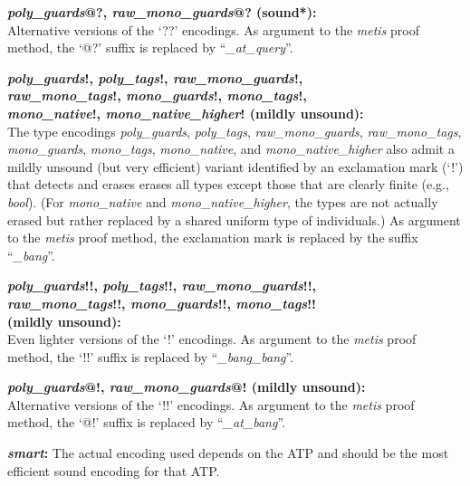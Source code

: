 \documentclass[a4paper,12pt]{article}
\begin{document}
\begin{enum}
\begin{enum}
\item[\labelitemi]
\textbf{%
\textit{poly\_guards}@?, \textit{raw\_mono\_guards}@? (sound*):} \\
Alternative versions of the `\hbox{??}' encodings. As argument to the
\textit{metis} proof method, the `\hbox{@?}' suffix is replaced by
\hbox{``\textit{\_at\_query\/}''}.

\item[\labelitemi]
\textbf{%
\textit{poly\_guards}!, \textit{poly\_tags}!, \textit{raw\_mono\_guards}!, \\
\textit{raw\_mono\_tags}!, \textit{mono\_guards}!, \textit{mono\_tags}!, \\
\textit{mono\_native}!, \textit{mono\_native\_higher}! (mildly unsound):} \\
The type encodings \textit{poly\_guards}, \textit{poly\_tags},
\textit{raw\_mono\_guards}, \textit{raw\_mono\_tags}, \textit{mono\_guards},
\textit{mono\_tags}, \textit{mono\_native}, and \textit{mono\_native\_higher}
also admit a mildly unsound (but very efficient) variant identified by an
exclamation mark (`\hbox{!}') that detects and erases erases all types except
those that are clearly finite (e.g., \textit{bool}). (For \textit{mono\_native}
and \textit{mono\_native\_higher}, the types are not actually erased but rather
replaced by a shared uniform type of individuals.) As argument to the
\textit{metis} proof method, the exclamation mark is replaced by the suffix
\hbox{``\textit{\_bang\/}''}.

\item[\labelitemi]
\textbf{%
\textit{poly\_guards}!!, \textit{poly\_tags}!!, \textit{raw\_mono\_guards}!!, \\
\textit{raw\_mono\_tags}!!, \textit{mono\_guards}!!, \textit{mono\_tags}!! \\
(mildly unsound):} \\
Even lighter versions of the `\hbox{!}' encodings. As argument to the
\textit{metis} proof method, the `\hbox{!!}' suffix is replaced by
\hbox{``\textit{\_bang\_bang\/}''}.

\item[\labelitemi]
\textbf{%
\textit{poly\_guards}@!, \textit{raw\_mono\_guards}@! (mildly unsound):} \\
Alternative versions of the `\hbox{!!}' encodings. As argument to the
\textit{metis} proof method, the `\hbox{@!}' suffix is replaced by
\hbox{``\textit{\_at\_bang\/}''}.

\item[\labelitemi] \textbf{\textit{smart}:} The actual encoding used depends on
the ATP and should be the most efficient sound encoding for that ATP.
\end{enum}


\end{enum}
\end{document}
